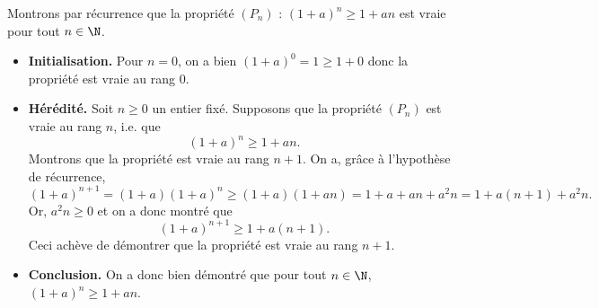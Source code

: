 Montrons par récurrence que la propriété $(P_n)$ : $(1+a)^n \geqslant 1 +an$ est vraie pour tout $n \in \N$.
 \begin{itemize}
 \item \textbf{Initialisation.} Pour $n = 0$, on a bien $(1+a)^0 = 1 \geqslant 1+0$ donc la propriété est vraie au rang $0$.
 \item \textbf{Hérédité.} Soit $n \geqslant 0$ un entier fixé. Supposons que la propriété $(P_n)$ est vraie au rang $n$, i.e. que \[ (1+a)^n \geqslant 1 +an.\]
 Montrons que la propriété est vraie au rang $n+1$. On a, grâce à l'hypothèse de récurrence,
 \[(1+a)^{n+1} = (1+a)(1+a)^n \geqslant (1+a)(1 +an) = 1 + a + an + a^2n = 1 + a(n+1) + a^2 n.\]
 Or, $a^2 n \geqslant 0$ et on a donc montré que 
 \[(1+a)^{n+1} \geqslant 1 + a(n+1).\]
 Ceci achève de démontrer que la propriété est vraie au rang $n+1$.
 \item \textbf{Conclusion.} On a donc bien démontré que pour tout $n \in \N$, $(1+a)^n \geqslant 1 +an$.
 \end{itemize}